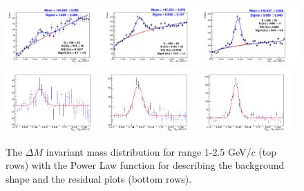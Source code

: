 \begin{figure}[tb]
\begin{center}
\includegraphics[width=1\textwidth]{figures/Dstar/pp13TeV/multi_trial/Figure_01.png}
\includegraphics[width=0.32\textwidth]{figures/Dstar/pp13TeV/multi_trial/residual_plot_Pow_bkg_func_1-1dot5GeV.png} 
\includegraphics[width=0.32\textwidth]{figures/Dstar/pp13TeV/multi_trial/residual_plot_Pow_bkg_func_1dot5-2GeV.png}
\includegraphics[width=0.32\textwidth]{figures/Dstar/pp13TeV/multi_trial/residual_plot_Pow_bkg_func_2-2dot5GeV.png} 
\caption{The \Dstar $\Delta M$ invariant mass distribution for \pt range 1-2.5 GeV/$c$ (top rows) with the Power Law function for describing the background shape and the residual plots (bottom rows).}
\label{fig:Dstar_compar}
\end{center}
\end{figure}



